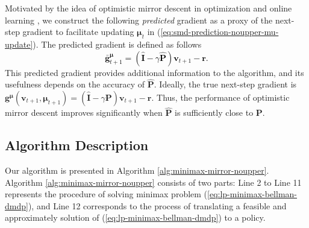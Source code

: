 \documentclass[12pt]{article}
\begin{document}
Motivated by the idea of optimistic mirror descent in optimization and online learning \cite{rakhlin2013online,joulani2017modular,orabona2019modern}, we construct the following \textit{predicted} gradient as a proxy of the next-step gradient to facilitate updating $\boldsymbol{\mu}_t$ in (\ref{eq:smd-prediction-noupper-mu-update}). The predicted gradient is defined as follows
\textcolor{black}{
\begin{equation}
    \bar{\boldsymbol{g}}_{t+1}^{\boldsymbol{\mu}} = (\hat{\boldsymbol{\text{I}}} - \gamma \hat{\boldsymbol{\text{P}}}) \boldsymbol{v}_{t+1} - \boldsymbol{\text{r}}.
   \label{eq:smd-prediction-noupper-mu-gradient-predicted}
\end{equation}
}
This predicted gradient provides additional information to the algorithm, and its usefulness depends on the accuracy of $\hat{\boldsymbol{\text{P}}}$. Ideally, the true next-step gradient is $\boldsymbol{g}^{\boldsymbol{\mu}}(\boldsymbol{v}_{t+1},\boldsymbol{\mu}_{t+1}) = (\hat{\boldsymbol{\text{I}}} - \gamma \boldsymbol{\text{P}}) \boldsymbol{v}_{t+1} - \boldsymbol{\text{r}}$. Thus, the performance of optimistic mirror descent improves significantly when $\hat{\boldsymbol{\text{P}}}$ is sufficiently close to $\boldsymbol{\text{P}}$.

\subsection{Algorithm Description}

\label{sec:alg-noupper-description}

Our algorithm is presented in Algorithm \ref{alg:minimax-mirror-noupper}. Algorithm \ref{alg:minimax-mirror-noupper} consists of two parts: Line 2 to Line 11 represents the procedure of solving minimax problem (\ref{eq:lp-minimax-bellman-dmdp}), and Line 12 corresponds to the process of translating a feasible and approximately solution of (\ref{eq:lp-minimax-bellman-dmdp}) to a policy.
\end{document}
